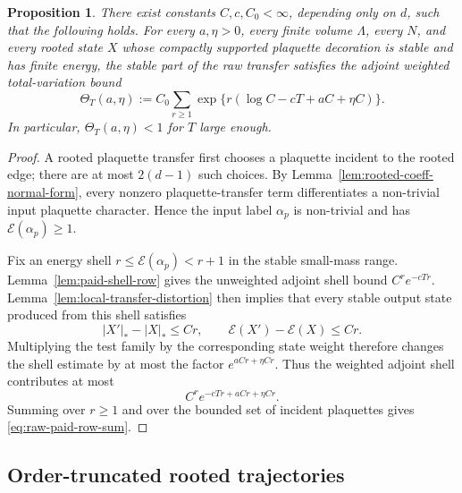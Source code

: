 \documentclass[11pt,a4paper,reqno]{amsart}
\newtheorem{proposition}[theorem]{Proposition}
\theoremstyle{definition}
\theoremstyle{remark}
\begin{document}
\begin{proposition}\label{prop:raw-plaquette-transfer}
There exist constants $C,c,C_0<\infty$, depending only on $d$, such that the following holds.  For every $a,\eta>0$, every finite volume $\Lambda$, every $N$, and every rooted state $X$ whose compactly supported plaquette decoration is stable and has finite energy, the stable part of the raw transfer satisfies the adjoint weighted total-variation bound
\begin{equation}\label{eq:raw-paid-row-sum}
\Theta_T(a,\eta)
:=
C_0\sum_{r\ge1}\exp\{r(\log C-cT+aC+\eta C)\}.
\end{equation}
In particular, $\Theta_T(a,\eta)<1$ for $T$ large enough.
\end{proposition}

\begin{proof}
A rooted plaquette transfer first chooses a plaquette incident to the rooted edge; there are at most $2(d-1)$ such choices.  By Lemma~\ref{lem:rooted-coeff-normal-form}, every nonzero plaquette-transfer term differentiates a non-trivial input plaquette character.  Hence the input label $\alpha_p$ is non-trivial and has $\mathcal E(\alpha_p)\ge1$.

Fix an energy shell $r\le \mathcal E(\alpha_p)<r+1$ in the stable small-mass range.  Lemma~\ref{lem:paid-shell-row} gives the unweighted adjoint shell bound $C^re^{-cTr}$.  Lemma~\ref{lem:local-transfer-distortion} then implies that every stable output state produced from this shell satisfies
\[
|X'|_*-|X|_*\le Cr,
\qquad
\mathcal E(X')-\mathcal E(X)\le Cr.
\]
Multiplying the test family by the corresponding state weight therefore changes the shell estimate by at most the factor $e^{aCr+\eta Cr}$.  Thus the weighted adjoint shell contributes at most
\[
C^r e^{-cTr+aCr+\eta Cr}.
\]
Summing over $r\ge1$ and over the bounded set of incident plaquettes gives \eqref{eq:raw-paid-row-sum}.
\end{proof}


\subsection{Order-truncated rooted trajectories}
\end{document}
